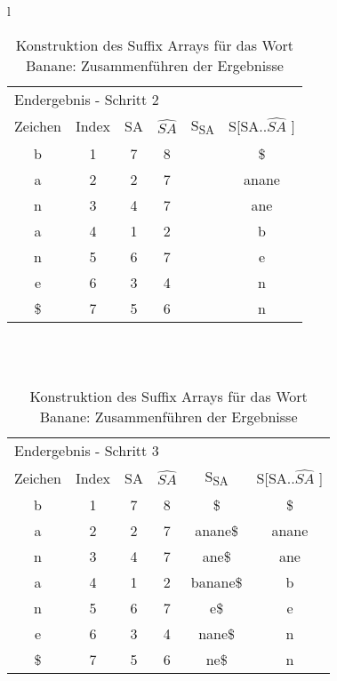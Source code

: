 \begin{table}[H]
\begin{center}
\begin{tabular}{l}
\begin{tabular}{cccccc}
\multicolumn{6}{l}{Endergebnis - Schritt 2}                                                                                                                 \\
Zeichen & Index & SA & \cellcolor[HTML]{\blue} $ \widehat{SA} $ & S\textsubscript{SA} & S{[}SA..$ \widehat{SA} $ {]} \\
b       & 1     & 7  & \cellcolor[HTML]{\blue}8  &     & \$            \\
a       & 2     & 2  & \cellcolor[HTML]{\blue}7  &     & anane         \\
n       & 3     & 4  & \cellcolor[HTML]{\blue}7  &     & ane           \\
a       & 4     & 1  & \cellcolor[HTML]{\blue}2  &     & b             \\
n       & 5     & 6  & \cellcolor[HTML]{\blue}7  &     & e             \\
e       & 6     & 3  & \cellcolor[HTML]{\blue}4  &     & n             \\
\$      & 7     & 5  & \cellcolor[HTML]{\blue}6  &     & n              
\end{tabular}

\\
\\

\begin{tabular}{cccccc}
\multicolumn{6}{l}{Endergebnis - Schritt 3}                                                                                                                 \\
Zeichen & Index & SA & $ \widehat{SA} $ & S\textsubscript{SA} & S{[}SA..$ \widehat{SA} $ {]} \\ \cline{5-5}
b       & 1     & 7  & \multicolumn{1}{c|}{8} & \multicolumn{1}{c|}{\$}       & \$            \\
a       & 2     & 2  & \multicolumn{1}{c|}{7} & \multicolumn{1}{c|}{anane\$}  & anane         \\
n       & 3     & 4  & \multicolumn{1}{c|}{7} & \multicolumn{1}{c|}{ane\$}    & ane           \\
a       & 4     & 1  & \multicolumn{1}{c|}{2} & \multicolumn{1}{c|}{banane\$} & b             \\
n       & 5     & 6  & \multicolumn{1}{c|}{7} & \multicolumn{1}{c|}{e\$}      & e             \\
e       & 6     & 3  & \multicolumn{1}{c|}{4} & \multicolumn{1}{c|}{nane\$}   & n             \\
\$      & 7     & 5  & \multicolumn{1}{c|}{6} & \multicolumn{1}{c|}{ne\$}     & n             \\ \cline{5-5}
\end{tabular}

\end{tabular}
\end{center}

\caption[Konstruktion des Suffix Arrays f{\"u}r das Wort Banane: Zusammenf{\"u}hren der Ergebnisse]{Konstruktion des Suffix Arrays f{\"u}r das Wort Banane: Zusammenf{\"u}hren der Ergebnisse}
\label{fig_banane_2_end}
\end{table}
